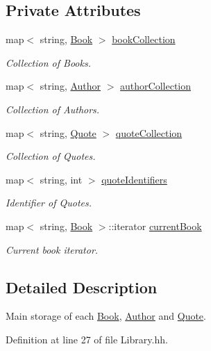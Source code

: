 \subsection*{Private Attributes}
\begin{DoxyCompactItemize}
\item 
map$<$ string, \hyperlink{class_book}{Book} $>$ \hyperlink{class_library_a5807d6d006ac0aa0a184831f0f2e5415}{book\+Collection}
\begin{DoxyCompactList}\small\item\em Collection of Books. \end{DoxyCompactList}\item 
map$<$ string, \hyperlink{class_author}{Author} $>$ \hyperlink{class_library_a7a6958a0dc85a1c816ca35727306cd62}{author\+Collection}
\begin{DoxyCompactList}\small\item\em Collection of Authors. \end{DoxyCompactList}\item 
map$<$ string, \hyperlink{class_quote}{Quote} $>$ \hyperlink{class_library_a84be5207332f4b2456af95907d0a43b5}{quote\+Collection}
\begin{DoxyCompactList}\small\item\em Collection of Quotes. \end{DoxyCompactList}\item 
map$<$ string, int $>$ \hyperlink{class_library_a58c1f12a0278872cd0299e586551bb7a}{quote\+Identifiers}
\begin{DoxyCompactList}\small\item\em Identifier of Quotes. \end{DoxyCompactList}\item 
map$<$ string, \hyperlink{class_book}{Book} $>$\+::iterator \hyperlink{class_library_a78a4071e8d610da671b3886c71900dae}{current\+Book}
\begin{DoxyCompactList}\small\item\em Current book iterator. \end{DoxyCompactList}\end{DoxyCompactItemize}


\subsection{Detailed Description}
Main storage of each \hyperlink{class_book}{Book}, \hyperlink{class_author}{Author} and \hyperlink{class_quote}{Quote}. 

Definition at line 27 of file Library.\+hh.



